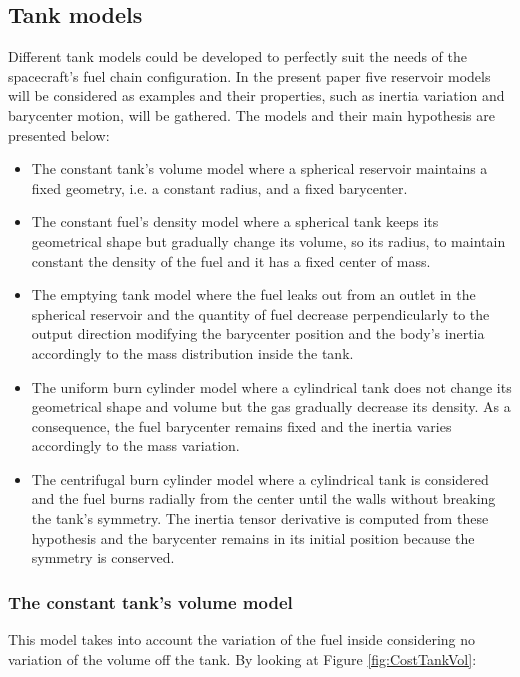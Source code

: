 \subsection{Tank models}
Different tank models could be developed to perfectly suit the needs of the spacecraft's fuel chain configuration. In the present paper five reservoir models will be considered as examples and their properties, such as inertia variation and barycenter motion, will be gathered.\newline
The models and their main hypothesis are presented below:

\begin{itemize}
	\item The constant tank's volume model where a spherical reservoir maintains a fixed geometry, i.e. a constant radius, and a fixed barycenter.
	\item The constant fuel's density model where a spherical tank keeps its geometrical shape but gradually change its volume, so its radius, to maintain constant the density of the fuel and it has a fixed center of mass.
	\item The emptying tank model where the fuel leaks out from an outlet in the spherical reservoir and the quantity of fuel decrease perpendicularly to the output direction modifying the barycenter position and the body's inertia accordingly to the mass distribution inside the tank.
	\item The uniform burn cylinder model where a cylindrical tank does not change its geometrical shape and volume but the gas gradually decrease its density. As a consequence, the fuel barycenter remains fixed and the inertia varies accordingly to the mass variation.
	\item The centrifugal burn cylinder model where a cylindrical tank is considered and the fuel burns radially from the center until the walls without breaking the tank's symmetry. The inertia tensor derivative is computed from these hypothesis and the barycenter remains in its initial position because the symmetry is conserved.
\end{itemize}

\subsubsection{The constant tank's volume model}
This model takes into account the variation of the fuel inside considering no variation of the volume off the tank. By looking at Figure \ref{fig:CostTankVol}:

